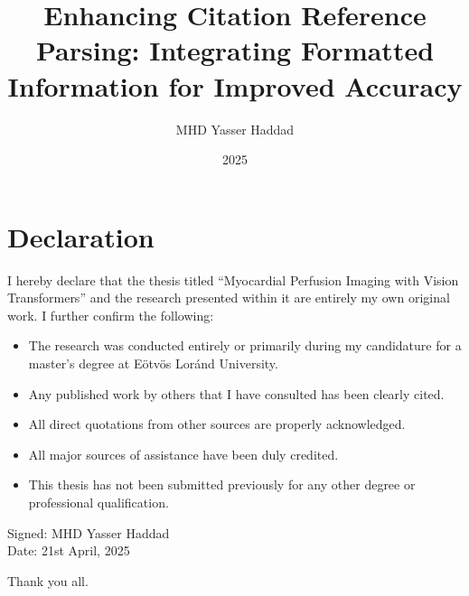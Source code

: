 \documentclass[
]{elteikthesis}[2024/04/26]
\title{Enhancing Citation Reference Parsing: Integrating Formatted Information for Improved
Accuracy} %
\date{2025} %
\author{MHD Yasser Haddad}
\affiliation{Lecturer} %
\begin{document}


\maketitle
%

\chapter*{Declaration}

I hereby declare that the thesis titled “Myocardial Perfusion Imaging with Vision Transformers” and the research presented within it are entirely my own original work. I further confirm the following:

\begin{itemize} 
	\item The research was conducted entirely or primarily during my candidature for a master's degree at Eötvös Loránd University. 
	\item Any published work by others that I have consulted has been clearly cited. 
	\item All direct quotations from other sources are properly acknowledged. 
	\item All major sources of assistance have been duly credited. 
	\item This thesis has not been submitted previously for any other degree or professional qualification. 
\end{itemize}

\vspace{1cm}
\noindent
Signed: MHD Yasser Haddad \\
\vspace{0.2cm}
Date: 21st April, 2025

\vspace{0.5cm}
\noindent
Thank you all.

\cleardoublepage

\tableofcontents
\cleardoublepage


\cleardoublepage


\cleardoublepage
\end{document}
